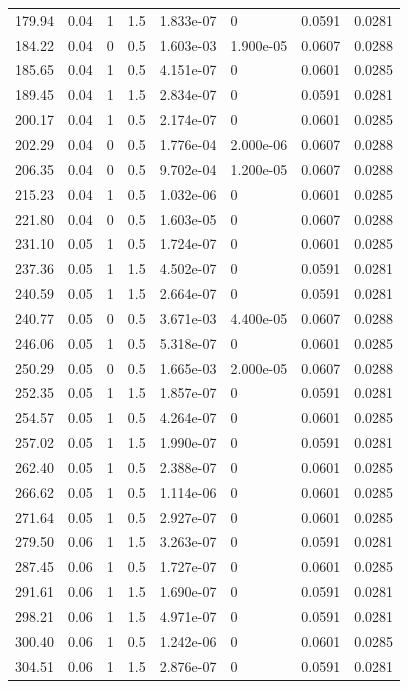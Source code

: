 \documentclass[preview]{standalone}
\begin{document}
{{\begin{tabular}{L{1.2cm}C{1.2cm} C{0.3cm}C{0.5cm} C{1.4cm}C{1.4cm} C{1.4cm}C{1.4cm}}
  179.94  &  0.04  & 1     & 1.5 &  1.833e-07  & 0  & 0.0591 &  0.0281   \\ 
  184.22  &  0.04  & 0     & 0.5 &  1.603e-03  & 1.900e-05  & 0.0607 &  0.0288   \\ 
  185.65  &  0.04  & 1     & 0.5 &  4.151e-07  & 0  & 0.0601 &  0.0285   \\ 
  189.45  &  0.04  & 1     & 1.5 &  2.834e-07  & 0  & 0.0591 &  0.0281   \\ 
  200.17  &  0.04  & 1     & 0.5 &  2.174e-07  & 0  & 0.0601 &  0.0285   \\ 
  202.29  &  0.04  & 0     & 0.5 &  1.776e-04  & 2.000e-06  & 0.0607 &  0.0288   \\ 
  206.35  &  0.04  & 0     & 0.5 &  9.702e-04  & 1.200e-05  & 0.0607 &  0.0288   \\ 
  215.23  &  0.04  & 1     & 0.5 &  1.032e-06  & 0  & 0.0601 &  0.0285   \\ 
  221.80  &  0.04  & 0     & 0.5 &  1.603e-05  & 0  & 0.0607 &  0.0288   \\ 
  231.10  &  0.05  & 1     & 0.5 &  1.724e-07  & 0  & 0.0601 &  0.0285   \\ 
  237.36  &  0.05  & 1     & 1.5 &  4.502e-07  & 0  & 0.0591 &  0.0281   \\ 
  240.59  &  0.05  & 1     & 1.5 &  2.664e-07  & 0  & 0.0591 &  0.0281   \\ 
  240.77  &  0.05  & 0     & 0.5 &  3.671e-03  & 4.400e-05  & 0.0607 &  0.0288   \\ 
  246.06  &  0.05  & 1     & 0.5 &  5.318e-07  & 0  & 0.0601 &  0.0285   \\ 
  250.29  &  0.05  & 0     & 0.5 &  1.665e-03  & 2.000e-05  & 0.0607 &  0.0288   \\ 
  252.35  &  0.05  & 1     & 1.5 &  1.857e-07  & 0  & 0.0591 &  0.0281   \\ 
  254.57  &  0.05  & 1     & 0.5 &  4.264e-07  & 0  & 0.0601 &  0.0285   \\ 
  257.02  &  0.05  & 1     & 1.5 &  1.990e-07  & 0  & 0.0591 &  0.0281   \\ 
  262.40  &  0.05  & 1     & 0.5 &  2.388e-07  & 0  & 0.0601 &  0.0285   \\ 
  266.62  &  0.05  & 1     & 0.5 &  1.114e-06  & 0  & 0.0601 &  0.0285   \\ 
  271.64  &  0.05  & 1     & 0.5 &  2.927e-07  & 0  & 0.0601 &  0.0285   \\ 
  279.50  &  0.06  & 1     & 1.5 &  3.263e-07  & 0  & 0.0591 &  0.0281   \\ 
  287.45  &  0.06  & 1     & 0.5 &  1.727e-07  & 0  & 0.0601 &  0.0285   \\ 
  291.61  &  0.06  & 1     & 1.5 &  1.690e-07  & 0  & 0.0591 &  0.0281   \\ 
  298.21  &  0.06  & 1     & 1.5 &  4.971e-07  & 0  & 0.0591 &  0.0281   \\ 
  300.40  &  0.06  & 1     & 0.5 &  1.242e-06  & 0  & 0.0601 &  0.0285   \\ 
  304.51  &  0.06  & 1     & 1.5 &  2.876e-07  & 0  & 0.0591 &  0.0281   \\ 
\hline 
\end{tabular} 

}}
\end{document}
